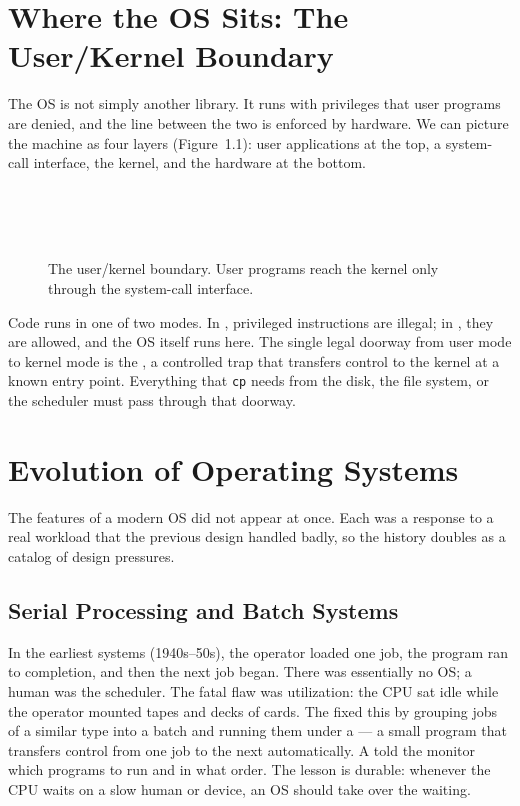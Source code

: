 \documentclass[11pt]{article}
\begin{document}
\section{Where the OS Sits: The User/Kernel Boundary}

The OS is not simply another library. It runs with privileges that user programs are denied, and the line between the two is enforced by hardware. We can picture the machine as four layers (Figure~1.1): user applications at the top, a system-call interface, the kernel, and the hardware at the bottom.

\begin{figure}[h]
\centering
{}\\[0.25em]
\\[0.25em]
\\[0.25em]
\caption{The user/kernel boundary. User programs reach the kernel only through the system-call interface.}
\end{figure}

Code runs in one of two modes. In , privileged instructions are illegal; in , they are allowed, and the OS itself runs here. The single legal doorway from user mode to kernel mode is the , a controlled trap that transfers control to the kernel at a known entry point. Everything that \texttt{cp} needs from the disk, the file system, or the scheduler must pass through that doorway.

\section{Evolution of Operating Systems}

The features of a modern OS did not appear at once. Each was a response to a real workload that the previous design handled badly, so the history doubles as a catalog of design pressures.

\subsection{Serial Processing and Batch Systems}

In the earliest  systems (1940s--50s), the operator loaded one job, the program ran to completion, and then the next job began. There was essentially no OS; a human was the scheduler. The fatal flaw was utilization: the CPU sat idle while the operator mounted tapes and decks of cards. The  fixed this by grouping jobs of a similar type into a batch and running them under a  --- a small program that transfers control from one job to the next automatically. A  told the monitor which programs to run and in what order. The lesson is durable: whenever the CPU waits on a slow human or device, an OS should take over the waiting.
\end{document}
